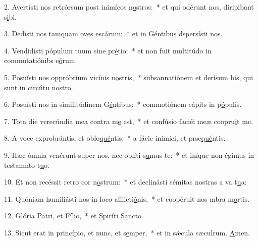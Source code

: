 2. Avertísti nos retrórsum post inimícos n\uline{o}stros:~* et qui odérunt nos, diripibant s\uline{i}bi.\par 
3. Dedísti nos tamquam oves esc\uline{á}rum:~* et in Géntibus dspers\uline{í}sti nos.\par 
4. Vendidísti pópulum tuum sine pr\uline{é}tio:~* et non fuit multitúdo in commutatiónibs e\uline{ó}rum.\par 
5. Posuísti nos oppróbrium vicínis n\uline{o}stris,~* subsannatiónem et derísum his, qui sunt in circútu n\uline{o}stro.\par 
6. Posuísti nos in similitúdinem G\uline{é}ntibus:~* commotiónem cápits in p\uline{ó}pulis.\par 
7. Tota die verecúndia mea contra m\uline{e} est,~* et confúsio faciéi meæ coopru\uline{i}t me.\par 
8. A voce exprobrántis, et oblo\uline{qué}ntis:~* a fácie inimíci, et prse\uline{qué}ntis.\par 
9. Hæc ómnia venérunt super nos, nec oblíti s\uline{u}mus te:~* et iníque non égimus in testamnto t\uline{u}o.\par 
10. Et non recéssit retro cor n\uline{o}strum:~* et declinásti sémitas nostras a va t\uline{u}a:\par 
11. Quóniam humiliásti nos in loco afflicti\uline{ó}nis,~* et coopéruit nos mbra m\uline{o}rtis.\par 
12. Glória Patri, et F\uline{í}lio,~* et Spiríti S\uline{a}ncto.\par 
13. Sicut erat in princípio, et nunc, et s\uline{e}mper,~* et in sǽcula sæculrum. \uline{A}men.\par 

